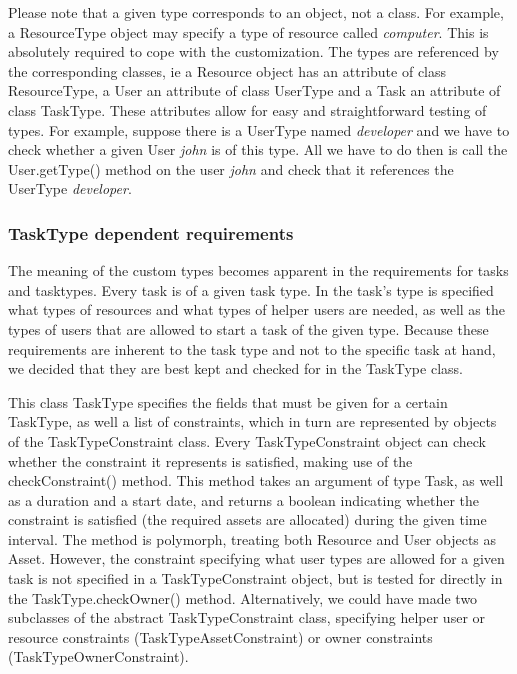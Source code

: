 				Please note that a given type corresponds to an object, not a class. For example, a ResourceType object may specify a type of resource called \emph{computer}. This is absolutely required to cope with the customization. The types are referenced by the corresponding classes, ie a Resource object has an attribute of class ResourceType, a User an attribute of class UserType and a Task an attribute of class TaskType. These attributes allow for easy and straightforward testing of types. For example, suppose there is a UserType named \emph{developer} and we have to check whether a given User \emph{john} is of this type. All we have to do then is call the User.getType() method on the user \emph{john} and check that it references the UserType \emph{developer}.
			\subsubsection{TaskType dependent requirements}
				The meaning of the custom types becomes apparent in the requirements for tasks and tasktypes. Every task is of a given task type. In the task's type is specified what types of resources and what types of helper users are needed, as well as the types of users that are allowed to start a task of the given type. Because these requirements are inherent to the task type and not to the specific task at hand, we decided that they are best kept and checked for in the TaskType class.
				
				This class TaskType specifies the fields that must be given for a certain TaskType, as well a list of constraints, which in turn are represented by objects of the TaskTypeConstraint class. Every TaskTypeConstraint object can check whether the constraint it represents is satisfied, making use of the checkConstraint() method. This method takes an argument of type Task, as well as a duration and a start date, and returns a boolean indicating whether the constraint is satisfied (the required assets are allocated) during the given time interval. The method is polymorph, treating both Resource and User objects as Asset. However, the constraint specifying what user types are allowed for a given task is not specified in a TaskTypeConstraint object, but is tested for directly in the TaskType.checkOwner() method. Alternatively, we could have made two subclasses of the abstract TaskTypeConstraint class, specifying helper user or resource constraints (TaskTypeAssetConstraint) or owner constraints (TaskTypeOwnerConstraint).
				
